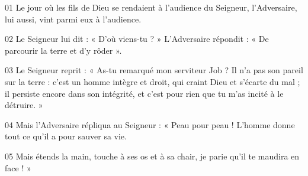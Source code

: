 01 Le jour où les fils de Dieu se rendaient à l’audience du Seigneur, l’Adversaire, lui aussi, vint parmi eux à l’audience.

02 Le Seigneur lui dit : « D’où viens-tu ? » L’Adversaire répondit : « De parcourir la terre et d’y rôder ».

03 Le Seigneur reprit : « As-tu remarqué mon serviteur Job ? Il n’a pas son pareil sur la terre : c’est un homme intègre et droit, qui craint Dieu et s’écarte du mal ; il persiste encore dans son intégrité, et c’est pour rien que tu m’as incité à le détruire. »

04 Mais l’Adversaire répliqua au Seigneur : « Peau pour peau ! L’homme donne tout ce qu’il a pour sauver sa vie.

05 Mais étends la main, touche à ses os et à sa chair, je parie qu’il te maudira en face ! »
